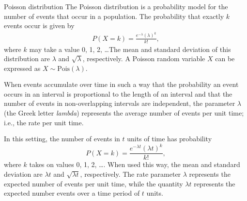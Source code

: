 \begin{onebox}{Poisson distribution}
The Poisson distribution is a probability model for the number of events that occur in a population.  The probability that exactly $k$ events occur is given by 
\begin{align*}
P(X = k) = \frac{e^{-\lambda}(\lambda)^{k}}{k!},
\end{align*}
where $k$ may take a value 0, 1, 2, \dots The mean and standard deviation of this distribution are $\lambda$ and $\sqrt{\lambda}$, respectively.
A Poisson random variable $X$ can be expressed as $X \sim \textrm{Pois}(\lambda)$.
\end{onebox}%

When events accumulate over time in such a way that the probability an event occurs in an interval is proportional to the length of an interval and that the number of events in non-overlapping intervals are independent, the parameter $\lambda$  (the Greek letter \textit{lambda}) represents the average number of events per unit time; i.e., the rate per unit time.

In this setting, the number of events in $t$ units of time has probability
\[P(X = k) = \frac{e^{-\lambda t}(\lambda t)^{k}}{k!}, \]
where $k$ takes on values 0, 1, 2, \dots.  When used this way, the mean and standard deviation  are $\lambda t$ and $\sqrt{\lambda t}$, respectively. The rate parameter $\lambda$ represents the expected number of events per unit time, while the quantity $\lambda t$ represents the expected number events over a time period of $t$ units.

